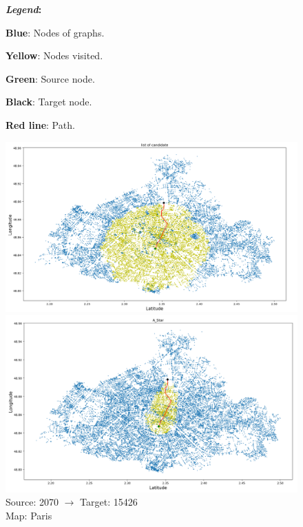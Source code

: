 \documentclass[a4paper,11pt]{report}
\begin{document}
\begin{figure}[H]
	\textbf{\textit{Legend}:}
	\begin{itemize}
{\small 		\item \textbf{Blue}: Nodes of graphs.
		\item \textbf{Yellow}: Nodes visited.
		\item \textbf{Green}: Source node.
		\item \textbf{Black}: Target node.
		\item \textbf{Red line}: Path.}
	\end{itemize}
	\centering
		\includegraphics[width=\textwidth]{img/mapOutput/2070-15426LoC.png}
		\label{fig:ListOfCandidate1}
		\includegraphics[width=\textwidth]{img/mapOutput/2070-15426A_Star.png}
		\label{fig:A_Start1}
	Source: 2070 $\to$ Target: 15426\\Map: Paris
\end{figure}
\end{document}
